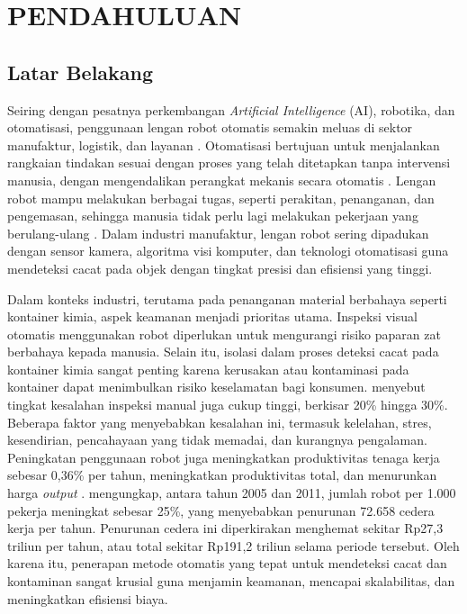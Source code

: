 \chapter{PENDAHULUAN}
\section{Latar Belakang}
Seiring dengan pesatnya perkembangan \textit{Artificial Intelligence} (AI),
robotika, dan otomatisasi, penggunaan lengan robot otomatis semakin
meluas di sektor manufaktur, logistik, dan layanan \citep{1}. Otomatisasi
bertujuan untuk menjalankan rangkaian tindakan sesuai dengan proses
yang telah ditetapkan tanpa intervensi manusia, dengan mengendalikan
perangkat mekanis secara otomatis \citep{2}. Lengan robot mampu melakukan
berbagai tugas, seperti perakitan, penanganan, dan pengemasan,
sehingga manusia tidak perlu lagi melakukan pekerjaan yang
berulang-ulang \citep{3}. Dalam industri manufaktur, lengan robot sering
dipadukan dengan sensor kamera, algoritma visi komputer, dan
teknologi otomatisasi guna mendeteksi cacat pada objek dengan tingkat
presisi dan efisiensi yang tinggi.

Dalam konteks industri, terutama pada penanganan material berbahaya
seperti kontainer kimia, aspek keamanan menjadi prioritas utama.
Inspeksi visual otomatis menggunakan robot diperlukan untuk
mengurangi risiko paparan zat berbahaya kepada manusia. Selain itu,
isolasi dalam proses deteksi cacat pada kontainer kimia sangat
penting karena kerusakan atau kontaminasi pada kontainer dapat
menimbulkan risiko keselamatan bagi konsumen. \citet{4} menyebut
tingkat kesalahan
inspeksi manual juga cukup tinggi, berkisar 20\% hingga 30\%.
Beberapa faktor yang menyebabkan kesalahan ini, termasuk kelelahan,
stres, kesendirian, pencahayaan yang tidak memadai, dan kurangnya
pengalaman. Peningkatan penggunaan robot juga meningkatkan
produktivitas tenaga kerja sebesar 0,36\% per tahun, meningkatkan
produktivitas total, dan menurunkan harga \textit{output} \citep{5}. \citet{6}
mengungkap, antara tahun 2005 dan 2011, jumlah robot per 1.000
pekerja meningkat sebesar 25\%, yang menyebabkan penurunan 72.658
cedera kerja per tahun. Penurunan cedera ini diperkirakan menghemat
sekitar Rp27,3 triliun per tahun, atau total sekitar Rp191,2
triliun selama periode tersebut. Oleh
karena itu, penerapan metode otomatis yang tepat untuk mendeteksi
cacat dan kontaminan sangat krusial guna menjamin keamanan, mencapai
skalabilitas, dan meningkatkan efisiensi biaya.

